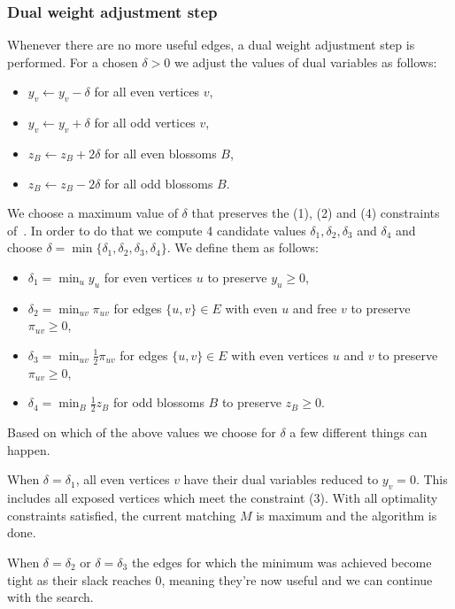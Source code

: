 \subsubsection*{Dual weight adjustment step}

Whenever there are no more useful edges, a dual weight adjustment step is performed. For a chosen $\delta > 0$ we adjust the values of dual variables as follows:

\begin{itemize}
    \item $y_v \gets y_v - \delta$ for all even vertices $v$,
    \item $y_v \gets y_v + \delta$ for all odd vertices $v$,
    \item $z_B \gets z_B + 2\delta$ for all even blossoms $B$,
    \item $z_B \gets z_B - 2\delta$ for all odd blossoms $B$.
\end{itemize}

We choose a maximum value of $\delta$ that preserves the (1), (2) and (4) constraints of~. In order to do that we compute 4 candidate values $\delta_1, \delta_2, \delta_3$ and $\delta_4$ and choose $\delta = \min \{\delta_1, \delta_2, \delta_3, \delta_4\}$. We define them as follows:

\begin{itemize}
    \item $\delta_1 = \min_{u} y_u$ for even vertices $u$ to preserve $y_u \geq 0$,
    \item $\delta_2 = \min_{uv} \pi_{uv}$ for edges $\{u, v\} \in E$ with even $u$ and free $v$ to preserve $\pi_{uv} \geq 0$,
    \item $\delta_3 = \min_{uv} \frac{1}{2}\pi_{uv}$ for edges $\{u, v\} \in E$ with even vertices $u$ and $v$ to preserve $\pi_{uv} \geq 0$,
    \item $\delta_4 = \min_{B} \frac{1}{2} z_B$ for odd blossoms $B$ to preserve $z_B \geq 0$.
\end{itemize}

Based on which of the above values we choose for $\delta$ a few different things can happen.

When $\delta = \delta_1$, all even vertices $v$ have their dual variables reduced to $y_v = 0$. This includes all exposed vertices which meet the constraint (3). With all optimality constraints satisfied, the current matching $M$ is maximum and the algorithm is done.

When $\delta = \delta_2$ or $\delta = \delta_3$ the edges for which the minimum was achieved become tight as their slack reaches $0$, meaning they're now useful and we can continue with the search.


